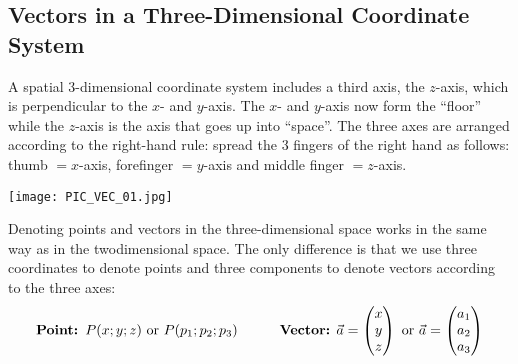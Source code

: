 \documentclass[12pt,eng]{skript_ogg}
\begin{document}
\subsection{Vectors in a Three-Dimensional Coordinate System}
A spatial 3-dimensional coordinate system includes a third axis, the $z$-axis, which is perpendicular to the $x$- and $y$-axis. The $x$- and $y$-axis now form the ``floor'' while the $z$-axis is the axis that goes up into ``space''. The three axes are arranged according to the right-hand rule: spread the 3 fingers of the right hand as follows: thumb $=x$-axis, forefinger $=y$-axis and middle finger $=z$-axis.
\begin{center}
	\texttt{[image: PIC\_VEC\_01.jpg]}
\end{center}


\begin{defn}
Denoting points and vectors in the three-dimensional space works in the same way as in the twodimensional space. The only difference is that we use three coordinates to denote points and
three components to denote vectors according to the three axes:
\[\mbox{\textbf{Point: }}P(x;y;z)\mbox{ or
}P(p_1;p_2;p_3)\qquad\quad\mbox{\textbf{Vector:}
}\vec{a}=\begin{pmatrix} x\\y\\z
\end{pmatrix}\mbox{ or }\vec{a}=\begin{pmatrix}
a_1\\a_2\\a_3
\end{pmatrix}\]
\end{defn}

\vspace{-4mm}
\end{document}
